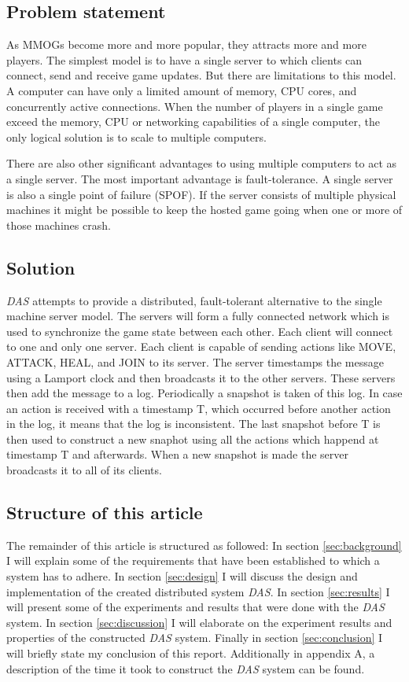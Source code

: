 \documentclass{article}
\begin{document}
\subsection{Problem statement}

As MMOGs become more and more popular, they attracts more and more players. The simplest model is to have a single server to which clients can connect, send and receive game updates. But there are limitations to this model. A computer can have only a limited amount of memory, CPU cores, and concurrently active connections. When the number of players in a single game exceed the memory, CPU or networking capabilities of a single computer, the only logical solution is to scale to multiple computers.

There are also other significant advantages to using multiple computers to act as a single server. The most important advantage is fault-tolerance. A single server is also a single point of failure (SPOF). If the server consists of multiple physical machines it might be possible to keep the hosted game going when one or more of those machines crash.

\subsection{Solution}

\textit{DAS} attempts to provide a distributed, fault-tolerant alternative to the single machine server model. The servers will form a fully connected network which is used to synchronize the game state between each other. Each client will connect to one and only one server. Each client is capable of sending actions like MOVE, ATTACK, HEAL, and JOIN to its server. The server timestamps the message using a Lamport clock and then broadcasts it to the other servers. These servers then add the message to a log. Periodically a snapshot is taken of this log. In case an action is received with a timestamp T, which occurred before another action in the log, it means that the log is inconsistent. The last snapshot before T is then used to construct a new snaphot using all the actions which happend at timestamp T and afterwards. When a new snapshot is made the server broadcasts it to all of its clients.

\subsection{Structure of this article}
The remainder of this article is structured as followed: In section \ref{sec:background} I will explain some of the requirements that have been established to which a system has to adhere. In section \ref{sec:design} I will discuss the design and implementation of the created distributed system \textit{DAS}. In section \ref{sec:results} I will present some of the experiments and results that were done with the \textit{DAS} system. In section \ref{sec:discussion} I will elaborate on the experiment results and properties of the constructed \textit{DAS} system. Finally in section \ref{sec:conclusion} I will briefly state my conclusion of this report. Additionally in appendix A, a description of the time it took to construct the \textit{DAS} system can be found.
\end{document}
